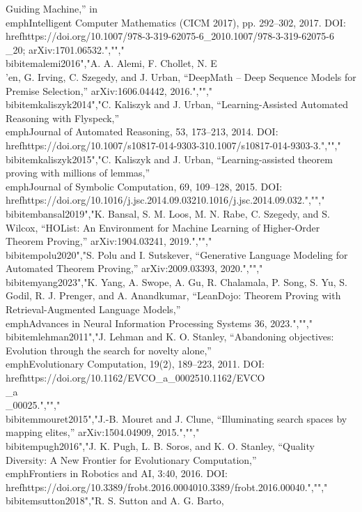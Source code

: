 {{{Guiding Machine,'' in \\emph{Intelligent Computer Mathematics (CICM 2017)}, pp. 292--302, 2017. DOI: \\href{https://doi.org/10.1007/978-3-319-62075-6_20}{10.1007/978-3-319-62075-6\\_20}; arXiv:1701.06532.","","\\bibitem{alemi2016}","A. A. Alemi, F. Chollet, N. E\\'en, G. Irving, C. Szegedy, and J. Urban, ``DeepMath -- Deep Sequence Models for Premise Selection,'' arXiv:1606.04442, 2016.","","\\bibitem{kaliszyk2014}","C. Kaliszyk and J. Urban, ``Learning-Assisted Automated Reasoning with Flyspeck,'' \\emph{Journal of Automated Reasoning}, 53, 173--213, 2014. DOI: \\href{https://doi.org/10.1007/s10817-014-9303-3}{10.1007/s10817-014-9303-3}.","","\\bibitem{kaliszyk2015}","C. Kaliszyk and J. Urban, ``Learning-assisted theorem proving with millions of lemmas,'' \\emph{Journal of Symbolic Computation}, 69, 109--128, 2015. DOI: \\href{https://doi.org/10.1016/j.jsc.2014.09.032}{10.1016/j.jsc.2014.09.032}.","","\\bibitem{bansal2019}","K. Bansal, S. M. Loos, M. N. Rabe, C. Szegedy, and S. Wilcox, ``HOList: An Environment for Machine Learning of Higher-Order Theorem Proving,'' arXiv:1904.03241, 2019.","","\\bibitem{polu2020}","S. Polu and I. Sutskever, ``Generative Language Modeling for Automated Theorem Proving,'' arXiv:2009.03393, 2020.","","\\bibitem{yang2023}","K. Yang, A. Swope, A. Gu, R. Chalamala, P. Song, S. Yu, S. Godil, R. J. Prenger, and A. Anandkumar, ``LeanDojo: Theorem Proving with Retrieval-Augmented Language Models,'' \\emph{Advances in Neural Information Processing Systems 36}, 2023.","","\\bibitem{lehman2011}","J. Lehman and K. O. Stanley, ``Abandoning objectives: Evolution through the search for novelty alone,'' \\emph{Evolutionary Computation}, 19(2), 189--223, 2011. DOI: \\href{https://doi.org/10.1162/EVCO_a_00025}{10.1162/EVCO\\_a\\_00025}.","","\\bibitem{mouret2015}","J.-B. Mouret and J. Clune, ``Illuminating search spaces by mapping elites,'' arXiv:1504.04909, 2015.","","\\bibitem{pugh2016}","J. K. Pugh, L. B. Soros, and K. O. Stanley, ``Quality Diversity: A New Frontier for Evolutionary Computation,'' \\emph{Frontiers in Robotics and AI}, 3:40, 2016. DOI: \\href{https://doi.org/10.3389/frobt.2016.00040}{10.3389/frobt.2016.00040}.","","\\bibitem{sutton2018}","R. S. Sutton and A. G. Barto, }}}
